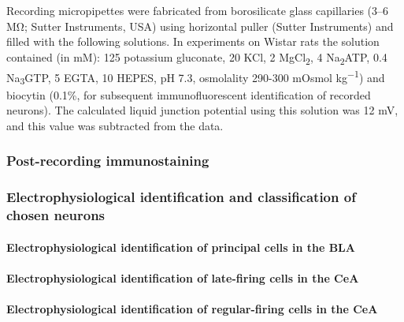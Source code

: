 \documentclass[
]{article}
\let\oldparagraph\paragraph
\renewcommand{\paragraph}[1]{\oldparagraph{#1}\mbox{}}
\begin{document}
Recording micropipettes were fabricated from borosilicate glass
capillaries (3--6 MΩ; Sutter Instruments, USA) using horizontal puller
(Sutter Instruments) and filled with the following solutions. In
experiments on Wistar rats the solution contained (in mM): 125 potassium
gluconate, 20 KCl, 2 MgCl\textsubscript{2}, 4 Na\textsubscript{2}ATP,
0.4 Na\textsubscript{3}GTP, 5 EGTA, 10 HEPES, pH 7.3, osmolality 290-300
mOsmol kg\textsuperscript{−1}) and biocytin (0.1\%, for subsequent
immunofluorescent identification of recorded neurons). The calculated
liquid junction potential using this solution was 12 mV, and this value
was subtracted from the data.

\hypertarget{post-recording-immunostaining}{%
\subsubsection{Post-recording
immunostaining}\label{post-recording-immunostaining}}

\hypertarget{electrophysiological-identification-and-classification-of-chosen-neurons}{%
\subsubsection{Electrophysiological identification and classification of
chosen
neurons}\label{electrophysiological-identification-and-classification-of-chosen-neurons}}

\hypertarget{electrophysiological-identification-of-principal-cells-in-the-bla}{%
\paragraph{Electrophysiological identification of principal cells in the
BLA}\label{electrophysiological-identification-of-principal-cells-in-the-bla}}

\hypertarget{electrophysiological-identification-of-late-firing-cells-in-the-cea}{%
\paragraph{Electrophysiological identification of late-firing cells in
the
CeA}\label{electrophysiological-identification-of-late-firing-cells-in-the-cea}}

\hypertarget{electrophysiological-identification-of-regular-firing-cells-in-the-cea}{%
\paragraph{Electrophysiological identification of regular-firing cells
in the
CeA}\label{electrophysiological-identification-of-regular-firing-cells-in-the-cea}}
\end{document}
